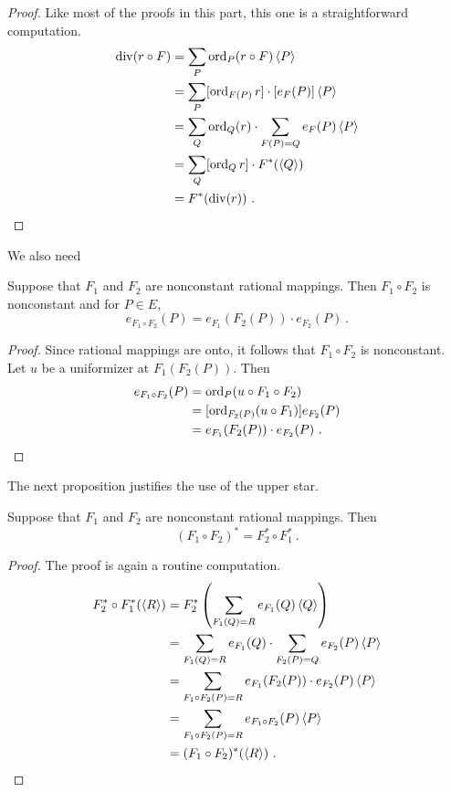 \begin{proof} 
Like most of the proofs in this part, this one is a straightforward computation.
\begin{align*}
\operatorname{div}(r\circ F)&=\sum_{P}\operatorname{ord}_{P}(r\circ F)\left\langle P \right \rangle\\
&=\sum_{P}[\operatorname{ord}_{F(P)}r]\cdot[e_{F}(P)]\left\langle P \right \rangle\\
&=\sum_{Q}\operatorname{ord}_{Q}(r)\cdot\sum_{F(P)=Q}e_{F}(P)\left\langle P \right \rangle\\
&=\sum_{Q}[\operatorname{ord}_{Q}r]\cdot F^{*}(\left\langle Q \right \rangle)\\
&=F^{*}(\operatorname{div}(r))\ .
\end{align*}
\end{proof}

We also need

\begin{lem}
\label{l11.10}
Suppose that $F_{1}$ and $F_{2}$ are nonconstant rational mappings. Then $F_{1}\circ F_{2}$ is nonconstant and for $P\in E$,
$$
e_{F_{1}\circ F_{2}}(P)=e_{F_{1}}(F_{2}(P))\cdot e_{F_{2}}(P)\ .
$$
\end{lem}

\begin{proof}
Since rational mappings are onto, it follows that $F_{1}\circ F_{2}$ is nonconstant. Let $u$ be a uniformizer at $F_{1}(F_{2}(P))$. Then
\begin{align*}
e_{F_{1}\circ F_{2}}(P)&=\operatorname{ord}_{P}(u\circ F_{1}\circ F_{2})\\
&=[\operatorname{ord}_{F_{2}(P)}(u\circ F_{1})]e_{F_{2}}(P)\\
&=e_{F_{1}}(F_{2}(P))\cdot e_{F_{2}}(P)\ .
\end{align*}
\end{proof}

The next proposition justifies the use of the upper star.

\begin{prop}
\label{p11.11}
Suppose that $F_{1}$ and $F_{2}$ are nonconstant rational mappings. Then
$$
(F_{1}\circ F_{2})^{*}=F_{2}^{*}\circ F_{1}^{*}\ .
$$
\end{prop}

\begin{proof}
The proof is again a routine computation.
\begin{align*}
F_{2}^{*}\circ F_{1}^{*}(\left\langle R \right \rangle)&=F_{2}^{*}\left(\sum_{F_{1}(Q)=R}e_{F_{1}}(Q)\left\langle Q \right \rangle\right)\\
&=\sum_{F_{1}(Q)=R}e_{F_{1}}(Q)\cdot\sum_{F_{2}(P)=Q}e_{F_{2}}(P)\left\langle P \right \rangle\\
&=\sum_{F_{1}\circ F_{2}(P)=R}e_{F_{1}}(F_{2}(P))\cdot e_{F_{2}}(P)\left\langle P \right \rangle\\
&=\sum_{F_{1}\circ F_{2}(P)=R}e_{F_{1}\circ F_{2}}(P)\left\langle P \right \rangle\\
&=(F_{1}\circ F_{2})^{*}(\left\langle R \right \rangle)\ .
\end{align*}
\end{proof}


